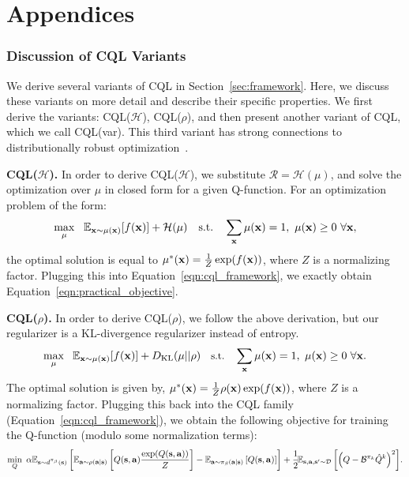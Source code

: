 \part*{Appendices}


\section{Discussion of CQL Variants}
\label{app:cql_variants}
We derive several variants of CQL in Section~\ref{sec:framework}. Here, we discuss these variants on more detail and describe their specific properties. We first derive the variants: CQL($\mathcal{H}$), CQL($\rho$), and then present another variant of CQL, which we call CQL(var). This third variant has strong connections to distributionally robust optimization~\citep{namkoong2017variance}.

\textbf{CQL($\mathcal{H}$).} In order to derive CQL($\mathcal{H}$), we substitute $\mathcal{R} = \mathcal{H}(\mu)$, and solve the optimization over $\mu$ in closed form for a given Q-function. For an optimization problem of the form:
\begin{equation*}
    \max_{\mu}~~ \mathbb{E}_{\mathbf{x} \sim \mu(\mathbf{x})}[f(\mathbf{x})] + \mathcal{H}(\mu)~~~ \text{s.t.}~~~ \sum_{\mathbf{x}} \mu(\mathbf{x}) = 1,~ \mu({\mathbf{x}}) \geq 0~ \forall \mathbf{x},
\end{equation*}
the optimal solution is equal to $\mu^*(\mathbf{x}) = \frac{1}{Z} \exp(f(\mathbf{x}))$, where $Z$ is a normalizing factor. Plugging this into Equation~\ref{eqn:cql_framework}, we exactly obtain Equation~\ref{eqn:practical_objective}.

\textbf{CQL($\rho$).} In order to derive CQL($\rho$), we follow the above derivation, but our regularizer is a KL-divergence regularizer instead of entropy.
\begin{equation*}
    \small{\max_{\mu}~~ \mathbb{E}_{\mathbf{x}\sim \mu(\mathbf{x})}[f(\mathbf{x})] + D_{\mathrm{KL}}(\mu || \rho)~~~ \text{s.t.}~~~ \sum_{\mathbf{x}} \mu(\mathbf{x}) = 1,~ \mu({\mathbf{x}}) \geq 0~ \forall \mathbf{x}}.
\end{equation*}
The optimal solution is given by, $\mu^*(\mathbf{x}) = \frac{1}{Z} \rho(\mathbf{x}) \exp(f(\mathbf{x}))$, where $Z$ is a normalizing factor. Plugging this back into the CQL family (Equation~\ref{eqn:cql_framework}), we obtain the following objective for training the Q-function (modulo some normalization terms):
\begin{equation}
    \small{\min_{Q}~ \alpha \mathbb{E}_{\mathbf{s}\sim d^{\pi_\beta}(\mathbf{s})}\left[\mathbb{E}_{\mathbf{a}\sim \rho(\mathbf{a}|\mathbf{s})} \left[Q(\mathbf{s}, \mathbf{a}) \frac{\exp(Q(\mathbf{s}, \mathbf{a}))}{Z}\right] - \mathbb{E}_{\mathbf{a}\sim {\pi_\beta}(\mathbf{a}|\mathbf{s})}\left[Q(\mathbf{s}, \mathbf{a})\right]\right] + \frac{1}{2}\!\mathbb{E}_{\mathbf{s}, \mathbf{a}, \mathbf{s}' \sim \mathcal{D}}\left[\left(Q - \mathcal{B}^{\pi_k} \hat{Q}^{k} \right)^2 \right]\!.}
    \label{eqn:cql_rho_objective}
\end{equation}

